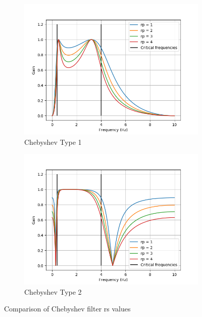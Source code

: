 \documentclass[12pt,a4paper,twoside,openright]{report}
\begin{document}
\begin{figure}[h]
\begin{subfigure}{.5\textwidth}
  \centering
  \includegraphics[width=\linewidth]{figs/cheby1-rp-comparison.png}
  \caption{Chebyshev Type 1}
  \label{fig:cheby1rs}
\end{subfigure}%
\begin{subfigure}{.5\textwidth}
  \centering
  \includegraphics[width=\linewidth]{figs/cheby2-rp-comparison.png}
  \caption{Chebyshev Type 2}
  \label{fig:cheby2rs}
\end{subfigure}
\caption{Comparison of Chebyshev filter rs values}
\label{fig:chebyrs}
\end{figure}
\end{document}
